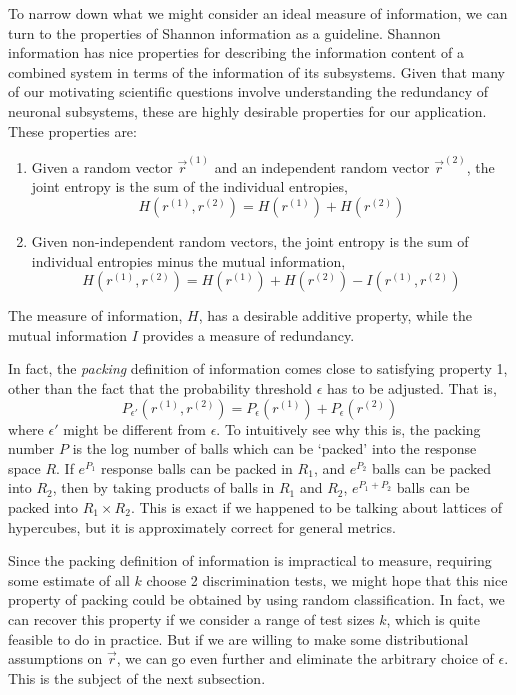 \documentclass[12pt]{article}
\begin{document}
To narrow down what we might consider an ideal measure of information,
we can turn to the properties of Shannon information as a guideline.
Shannon information has nice properties for describing the information
content of a combined system in terms of the information of its
subsystems.  Given that many of our motivating scientific questions
involve understanding the redundancy of neuronal subsystems, these are
highly desirable properties for our application.  These properties
are:
\begin{enumerate}
\item Given a random vector $\vec{r}^{(1)}$ and an independent random vector $\vec{r}^{(2)}$, the joint entropy is the sum of the individual entropies,
\[
H(r^{(1)}, r^{(2)}) = H(r^{(1)}) + H(r^{(2)})
\]
\item Given non-independent random vectors, the joint entropy is the sum of individual entropies minus the mutual information,
\[
H(r^{(1)}, r^{(2)}) = H(r^{(1)}) + H(r^{(2)}) - I(r^{(1)}, r^{(2)})
\]
\end{enumerate}
The measure of information, $H$, has a desirable additive property,
while the mutual information $I$ provides a measure of redundancy.

In fact, the \emph{packing} definition of information comes close to satisfying property 1, other than the fact that the probability threshold $\epsilon$ has to be adjusted.  That is,
\[
P_{\epsilon'}(r^{(1)}, r^{(2)}) = P_\epsilon(r^{(1)}) + P_\epsilon(r^{(2)})
\]
where $\epsilon'$ might be different from $\epsilon$.  To intuitively
see why this is, the packing number $P$ is the log number of balls
which can be `packed' into the response space $R$.  If $e^{P_1}$
response balls can be packed in $R_1$, and $e^{P_2}$ balls can be
packed into $R_2$, then by taking products of balls in $R_1$ and
$R_2$, $e^{P_1 + P_2}$ balls can be packed into $R_1 \times R_2$.
This is exact if we happened to be talking about lattices of
hypercubes, but it is approximately correct for general metrics.

Since the packing definition of information is impractical to measure,
requiring some estimate of all $k$ choose 2 discrimination tests, we
might hope that this nice property of packing could be obtained by
using random classification.  In fact, we can recover this property if
we consider a range of test sizes $k$, which is quite feasible to do
in practice.  But if we are willing to make some distributional
assumptions on $\vec{r}$, we can go even further and eliminate the
arbitrary choice of $\epsilon$.  This is the subject of the next
subsection.
\end{document}

